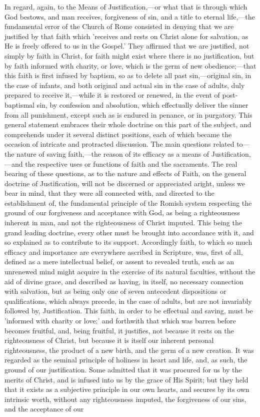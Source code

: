 \documentclass[
]{book}
\begin{document}
In regard, again, to the Means of Justification,---or what that is through which God bestows, and man receives, forgiveness of sin, and a title to eternal life,---the fundamental error of the Church of Rome consisted in denying that we are justified by that faith which 'receives and rests on Christ alone for salvation, as He is freely offered to us in the Gospel.' They affirmed that we are justified, not simply by faith in Christ, for faith might exist where there is no justification, but by faith informed with charity, or love, which is the germ of new obedience;---that this faith is first infused by baptism, so as to delete all past sin,---original sin, in the case of infants, and both original and actual sin in the case of adults, duly prepared to receive it,---while it is restored or renewed, in the event of post-baptismal sin, by confession and absolution, which effectually deliver the sinner from all punishment, except such as is endured in penance, or in purgatory. This general statement embraces their whole doctrine on this part of the subject, and comprehends under it several distinct positions, each of which became the occasion of intricate and protracted discussion. The main questions related to---the nature of saving faith,---the reason of its efficacy as a means of Justification,---and the respective uses or functions of faith and the sacraments. The real bearing of these questions, as to the nature and effects of Faith, on the general doctrine of Justification, will not be discerned or appreciated aright, unless we bear in mind, that they were all connected with, and directed to the establishment of, the fundamental principle of the Romish system respecting the ground of our forgiveness and acceptance with God, as being a righteousness inherent in man, and not the righteousness of Christ imputed. This being the grand leading doctrine, every other must be brought into accordance with it, and so explained as to contribute to its support. Accordingly faith, to which so much efficacy and importance are everywhere ascribed in Scripture, was, first of all, defined as a mere intellectual belief, or assent to revealed truth, such as an unrenewed mind might acquire in the exercise of its natural faculties, without the aid of divine grace, and described as having, in itself, no necessary connection with salvation, but as being only one of seven antecedent dispositions or qualifications, which always precede, in the case of adults, but are not invariably followed by, Justification. This faith, in order to be effectual and saving, must be 'informed with charity or love;' and forthwith that which was barren before becomes fruitful, and, being fruitful, it justifies, not because it rests on the righteousness of Christ, but because it is itself our inherent personal righteousness, the product of a new birth, and the germ of a new creation. It was regarded as the seminal principle of holiness in heart and life, and, as such, the ground of our justification. Some admitted that it was procured for us by the merits of Christ, and is infused into us by the grace of His Spirit; but they held that it exists as a subjective principle in our own hearts, and secures by its own intrinsic worth, without any righteousness imputed, the forgiveness of our sins, and the acceptance of our 
\end{document}
